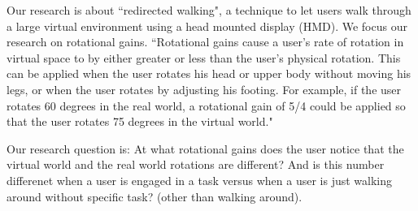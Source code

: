 Our research is about ``redirected walking", a technique to let users walk through a large virtual environment using a head mounted display (HMD).
We focus our research on rotational gains.
``Rotational gains cause a user's rate of rotation in virtual space to by either greater or less than 
the user's physical rotation. This can be applied when the user rotates his head or upper body 
without moving his legs, or when the user rotates by adjusting his footing. For example, if the 
user rotates 60 degrees in the real world, a rotational gain of 5/4 could be applied so that the 
user rotates 75 degrees in the virtual world."\cite{jwalker}

Our research question is: At what rotational gains does the user notice that the virtual world and the real world rotations are different? And is this number differenet when a user is engaged in a task versus when a user is just walking around without specific task? (other than walking around).
